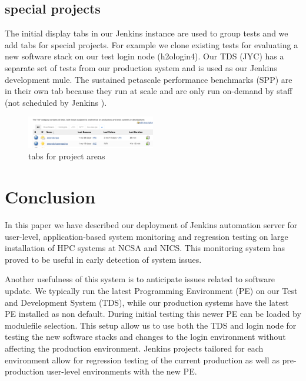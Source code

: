 \documentclass[10pt, conference, compsocconf]{IEEEtran}
\begin{document}
\subsection{special projects}
The initial display tabs in our Jenkins instance are used to group tests and we add tabs for special projects.   For example we clone existing tests for evaluating a new software stack on our test login node (h2ologin4).   Our TDS (JYC) has a separate set of tests from our production system and is used as our Jenkins development mule.  The sustained petascale performance benchmarks (SPP) are in their own tab because they run at scale and are only run on-demand by staff (not scheduled by Jenkins ).
\begin{figure}[H]
\centering
\includegraphics[width=0.5\textwidth]{tabs-display}
\caption{ tabs for project areas }
\label{fig:tabs-display}
\end{figure}

\section{Conclusion}
\label{sec:Conclusion}

In this paper we have described our deployment of Jenkins automation server for user-level, application-based system monitoring and regression testing on large installation of HPC systems at NCSA and NICS. 
This monitoring system has proved to be useful in early detection of system issues. 

Another usefulness of this system is to anticipate issues related to software update. 
We typically run the latest Programming Environment (PE) on our Test and Development System (TDS), while our production systems have the latest PE installed as non default. 
During initial testing this newer PE can be loaded by modulefile selection. This setup allow us to use both the TDS and login node for testing the new software stacks and changes to the login environment without affecting the production environment. 
Jenkins projects tailored for each environment allow for regression testing of the current production as well as pre-production user-level environments with the new PE.
\end{document}
